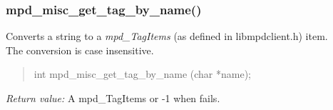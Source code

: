 \documentclass[a4paper,11pt]{article}
\begin{document}
	\subsubsection{mpd\_misc\_get\_tag\_by\_name()}
	Converts a string to a \textit{mpd\_TagItems} (as defined in libmpdclient.h) item. \\
	The conversion is case insensitive.\\
	\begin{quote}
	int 		mpd\_misc\_get\_tag\_by\_name		(char *name);
	\end{quote}
	\textit{Return value:} A mpd\_TagItems or -1 when fails.                                                            	
\end{document}
